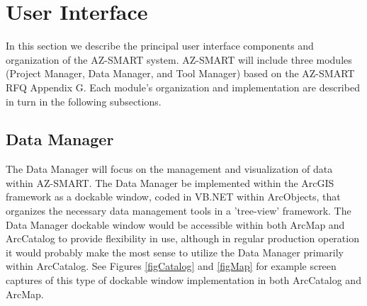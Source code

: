 \section{User Interface}

In this section we describe the principal user interface components
and organization of the AZ-SMART system.  AZ-SMART will include
three modules (Project Manager, Data Manager, and Tool Manager)
based on the AZ-SMART RFQ Appendix G. Each module's organization and
implementation are described in turn in the following subsections.



\subsection{Data Manager}

The Data Manager will focus on the management and visualization of
data within AZ-SMART.  The Data Manager be implemented within the
ArcGIS framework as a dockable window, coded in VB.NET within ArcObjects,
that organizes the necessary data management tools in a
'tree-view' framework.  The Data Manager dockable window would be
accessible within both ArcMap and ArcCatalog to provide flexibility
in use, although in regular production operation it would probably
make the most sense to utilize the Data Manager primarily within
ArcCatalog.  See Figures \ref{figCatalog} and \ref{figMap} for example
screen captures
of this type of dockable window implementation in both ArcCatalog
and ArcMap.


